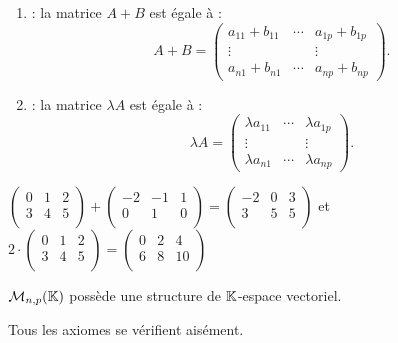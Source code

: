 \documentclass{book}
\begin{document}
\begin{Definition}
\begin{enumerate}
\item {} : la matrice $A+B$ est égale à :$$A+B= \begin{pmatrix}
a_{11}+b_{11} & \cdots & a_{1p}+b_{1p}\\
 \vdots &  & \vdots\\
a_{n1}+b_{n1} & \cdots & a_{np}+b_{np}
\end{pmatrix}.$$
  \item {} :
la matrice $\lambda A$ est égale à :$$\lambda A= \begin{pmatrix}
\lambda a_{11} & \cdots &\lambda a_{1p}\\
 \vdots &  & \vdots\\
\lambda a_{n1} & \cdots & \lambda a_{np}
\end{pmatrix}.$$
\end{enumerate}
\end{Definition}
\begin{Exemple}$
\begin{pmatrix}
0 &1 & 2 \\
3 &4 & 5 \\
\end{pmatrix} + 
\begin{pmatrix}
-2 &-1 & 1 \\
0 & 1 & 0 \\
\end{pmatrix}
=
\begin{pmatrix}
-2 &0 & 3\\
3 & 5 & 5\\
\end{pmatrix}
$
et $
2\cdot\begin{pmatrix}
0 &1 & 2 \\
3 &4 & 5 \\
\end{pmatrix} 
=
\begin{pmatrix}
0 &2 & 4 \\
6 &8 & 10 \\
\end{pmatrix}
$
\end{Exemple}
\begin{Proposition}
$\mathcal{M}_{n,p}(\mathbb{K})$ possède une structure de $\mathbb{K} $-espace vectoriel. 
\end{Proposition}
\begin{Demonstration}
Tous les axiomes se vérifient aisément.  
\end{Demonstration}
\end{document}
